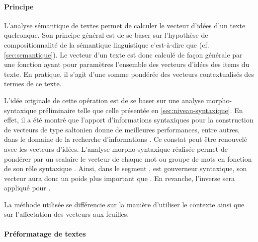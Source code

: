 \paragraph{Principe}
\label{sec:principe-analyse-sem}

L'analyse sémantique de textes permet de calculer le vecteur d'idées
d'un texte quelconque. Son principe général est de se baser sur
l'hypothèse de compositionnalité de la sémantique linguistique
c'est-à-dire que  (cf. \ref{sec:semantique}). Le vecteur d'un texte est
donc calculé de façon générale par une fonction ayant pour paramètres
l'ensemble des vecteurs d'idées des items du
texte.  En pratique, il s'agit d'une somme pondérée des vecteurs
contextualisés des termes de ce texte.

L'idée originale de cette opération est de se baser sur une analyse
morpho-syntaxique préliminaire telle que celle présentée en
\ref{sec:niveau-syntaxique}. En effet, il a été montré que l'apport
d'informations syntaxiques pour la construction de vecteurs de type
saltonien donne de meilleures performances, entre autres, dans le
domaine de la recherche d'informations \cite{Besancon2001}. Ce constat
peut être renouvelé avec les  vecteurs
d'idées. L'analyse morpho-syntaxique réalisée permet de pondérer par
un scalaire le vecteur de chaque mot ou groupe de mots en fonction de
son rôle syntaxique \cite{Chauche2003}. Ainsi, dans le segment
,  est gouverneur syntaxique,
son vecteur aura donc un poids plus important que . En
revanche, l'inverse sera appliqué pour .

La méthode utilisée se différencie sur la
manière d'utiliser le contexte ainsi que sur l'affectation des
vecteurs aux feuilles.


\paragraph{Préformatage de textes}
\label{sec:preform-textes}

